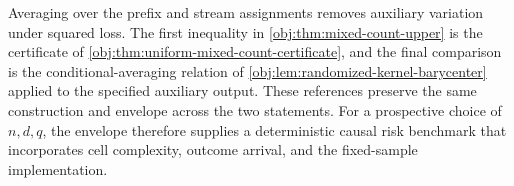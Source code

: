 Averaging over the prefix and stream assignments removes auxiliary variation under squared loss. The first inequality in \cref{obj:thm:mixed-count-upper} is the certificate of \cref{obj:thm:uniform-mixed-count-certificate}, and the final comparison is the conditional-averaging relation of \cref{obj:lem:randomized-kernel-barycenter} applied to the specified auxiliary output. These references preserve the same construction and envelope across the two statements. For a prospective choice of \(n,d,q\), the envelope therefore supplies a deterministic causal risk benchmark that incorporates cell complexity, outcome arrival, and the fixed-sample implementation.
